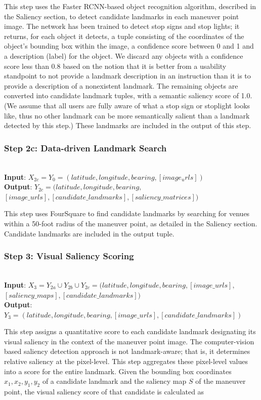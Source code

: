 This step uses the Faster RCNN-based object recognition algorithm, described in the Saliency section, to detect candidate landmarks in each maneuver point image. The network has been trained to detect stop signs and stop lights; it returns, for each object it detects, a tuple consisting of the coordinates of the object’s bounding box within the image, a confidence score between 0 and 1 and a description (label) for the object. We discard any objects with a confidence score less than 0.8 based on the notion that it is better from a usability standpoint to not provide a landmark description in an instruction than it is to provide a description of a nonexistent landmark. The remaining objects are converted into candidate landmark tuples, with a semantic saliency score of 1.0. (We assume that all users are fully aware of what a stop sign or stoplight looks like, thus no other landmark can be more semantically salient than a landmark detected by this step.) These landmarks are included in the output of this step.

\subsubsection*{Step 2c: Data-driven Landmark Search}~\\
\textbf{Input}: $X_{2c} = Y_0 = (latitude, longitude, bearing, [image_urls])$\\
\noindent\textbf{Output}: $Y_{2c} = (latitude, longitude, bearing,$ \\ $[image\_urls], [candidate\_landmarks], [saliency\_matrices] )$

This step uses FourSquare to find candidate landmarks by searching for venues within a 50-foot radius of the maneuver point, as detailed in the Saliency section. Candidate landmarks are included in the output tuple.

\subsubsection*{Step 3: Visual Saliency Scoring}~\\
\textbf{Input}: $X_3 = Y_{2a} \cup Y_{2b} \cup Y_{2c} = (latitude, longitude, bearing,  [image\_urls],$\\ $[saliency\_maps], [candidate\_landmarks] )$\\
\noindent\textbf{Output}: $Y_3 = (latitude, longitude, bearing,  [image\_urls], [candidate\_landmarks] )$ 

This step assigns a quantitative score to each candidate landmark designating its visual saliency in the context of the maneuver point image. The computer-vision based saliency detection approach is not landmark-aware; that is, it determines relative saliency at the pixel-level. This step aggregates these pixel-level values into a score for the entire landmark. Given the bounding box coordinates $x_1, x_2, y_1,y_2$ of a candidate landmark and the saliency map $S$ of the maneuver point, the visual saliency score of that candidate is calculated as

